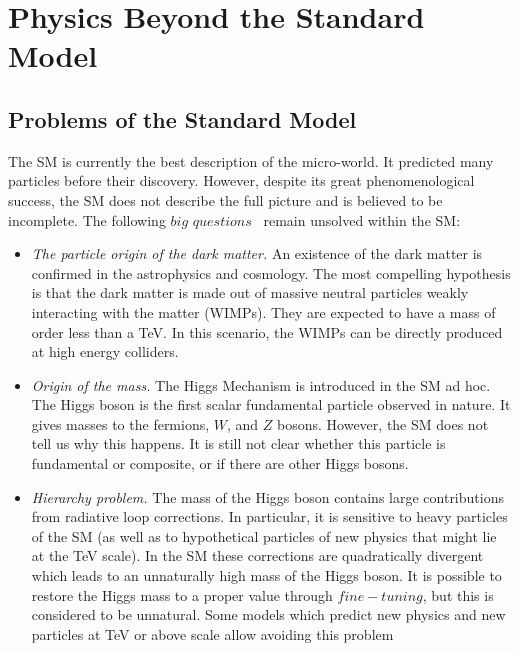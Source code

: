\section{Physics Beyond the Standard Model}

\subsection{Problems of the Standard Model}

The SM is currently the best description of the micro-world. It predicted many particles before their discovery. However, despite its great phenomenological success, the SM does not describe the full picture and is believed to be incomplete. The following $big$ $questions$~\cite{Gershtein:2013iqa} remain unsolved within the SM:
\begin{itemize}
\item \textit{The particle origin of the dark matter.} An existence of the dark matter is confirmed in the astrophysics and cosmology. The most compelling hypothesis is that the dark matter is made out of massive neutral particles weakly interacting with the matter (WIMPs). They are expected to have a mass of order less than a TeV. In this scenario, the WIMPs can be directly produced at high energy colliders.
\item \textit{Origin of the mass.} The Higgs Mechanism is introduced in the SM ad hoc. The Higgs boson is the first scalar fundamental particle observed in nature. It gives masses to the fermions, $W$, and $Z$ bosons. However, the SM does not tell us why this happens. It is still not clear whether this particle is fundamental or composite, or if there are other Higgs bosons.
\item \textit{Hierarchy problem.} The mass of the Higgs boson contains large contributions from radiative loop corrections. In particular, it is sensitive to heavy particles of the SM (as well as to hypothetical particles of new physics that might lie at the TeV scale). 
In the SM these corrections are quadratically divergent which leads to an unnaturally high mass of the Higgs boson. It is possible to restore the Higgs mass to a proper value through $fine-tuning$, but this is considered to be unnatural. Some models which predict new physics and new particles at TeV or above scale allow avoiding this problem

\end{itemize}
